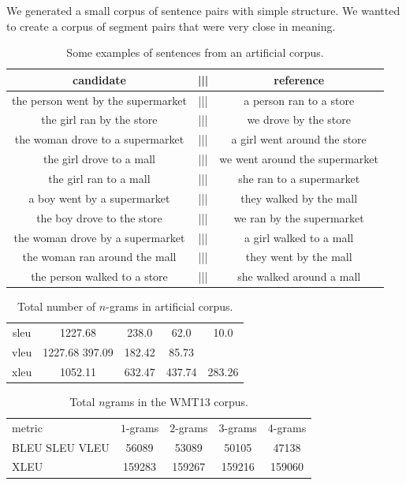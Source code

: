 We generated a small corpus of sentence pairs with simple structure. 
We wantted to create a corpus of segment pairs that were very close in meaning. 

\begin{table}[h]
  \centering
  \begin{tabular}{|c|c|c|}
    candidate & ||| & reference \\
\hline
the person went by the supermarket & ||| & a person ran to a store \\
the girl ran by the store & ||| & we drove by the store \\
the woman drove to a supermarket & ||| & a girl went around the store \\
the girl drove to a mall & ||| & we went around the supermarket \\
the girl ran to a mall & ||| & she ran to a supermarket \\
a boy went by a supermarket & ||| & they walked by the mall \\
the boy drove to the store & ||| & we ran by the supermarket \\
the woman drove by a supermarket & ||| & a girl walked to a mall \\
the woman ran around the mall & ||| & they went by the mall \\
the person walked to a store & ||| & she walked around a mall \\
\hline
  \end{tabular}
  \caption{Some examples of sentences from an artificial corpus.}
  \label{tab:sentencexamples}
\end{table}

\begin{table}
  \centering
  \begin{tabular}{|c|c|c|c|c|}
\hline
sleu & 1227.68 & 238.0 & 62.0 & 10.0 \\
vleu& 1227.68 397.09 & 182.42 & 85.73 \\
xleu	& 1052.11 & 632.47 & 437.74 & 283.26 \\
\hline
  \end{tabular}
  \caption{Total number of $n$-grams in artificial corpus.}
  \label{tab:artificialtotalngrams}
\end{table}
\begin{table}[h]
  \centering
  \begin{tabular}{|l||c|c|c|c|}
    \hline
metric & $1$-grams & $2$-grams & $3$-grams & $4$-grams \\
BLEU SLEU VLEU & 56089 &  53089 & 50105 & 47138 \\
XLEU & 159283 & 159267 & 159216 & 159060 \\
\hline
  \end{tabular}
  \caption{Total $n$grams in the WMT13 corpus.}
  \label{tab:totalngrams}
\end{table}



